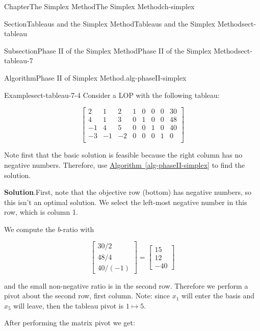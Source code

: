 \documentclass[oneside,10pt,]{book}
\newcommand{\blocktitlefont}{\relax}
\newcommand{\xreffont}{\relax}
\numberwithin{equation}{section}
\newcommand{\amp}{&}
\begin{document}
\begin{chapterptx}{Chapter}{The Simplex Method}{}{The Simplex Method}{}{}{ch-simplex}
\begin{sectionptx}{Section}{Tableaus and the Simplex Method}{}{Tableaus and the Simplex Method}{}{}{sect-tableau}
\begin{subsectionptx}{Subsection}{Phase II of the Simplex Method}{}{Phase II of the Simplex Method}{}{}{sect-tableau-7}
\begin{algorithm}{Algorithm}{Phase II of Simplex Method.}{}{alg-phaseII-simplex}
\begin{enumerate}
\end{enumerate}
%
\end{algorithm}
\begin{example}{Example}{}{sect-tableau-7-4}%
Consider a LOP with the following tableau:%
\par
%
\begin{equation*}
\left[\begin{array}{rrr|rrrr|r} 2 \amp 1 \amp 2 \amp 1 \amp 0 \amp 0 \amp 0 \amp 30\\ 4 \amp 1 \amp 3 \amp 0 \amp 1 \amp 0 \amp 0 \amp 48\\ -1 \amp 4 \amp 5 \amp 0 \amp 0 \amp 1 \amp 0 \amp 40\\ \hline -3 \amp -1 \amp -2 \amp 0 \amp 0 \amp 0 \amp 1 \amp 0\\ \end{array} \right]
\end{equation*}
%
\par
Note first that the basic solution is feasible because the right column has no negative numbers. Therefore, use \hyperref[alg-phaseII-simplex]{Algorithm~{\xreffont\ref{alg-phaseII-simplex}}} to find the solution.%
\par\smallskip%
\noindent\textbf{\blocktitlefont Solution}.\hypertarget{sect-tableau-7-4-2}{}\quad{}First, note that the objective row (bottom) has negative numbers, so this isn't an optimal solution. We select the left-most negative number in this row, which is column 1.%
\par
We compute the \(b\)-ratio with%
\par
%
\begin{equation*}
\begin{bmatrix} 30/2 \\ 48/4 \\ 40/(-1) \end{bmatrix} = \begin{bmatrix} 15 \\ 12 \\ -40 \end{bmatrix}
\end{equation*}
%
\par
and the small non-negative ratio is in the second row. Therefore we perform a pivot about the second row, first column. Note: since \(x_1\) will enter the basis and \(x_5\) will leave, then the tableau pivot is \(1 \mapsto 5\).%
\par
After performing the matrix pivot we get:%
\par
%
\begin{equation*}

\end{equation*}
\end{example}
\end{subsectionptx}
\end{sectionptx}
\end{chapterptx}
\end{document}
